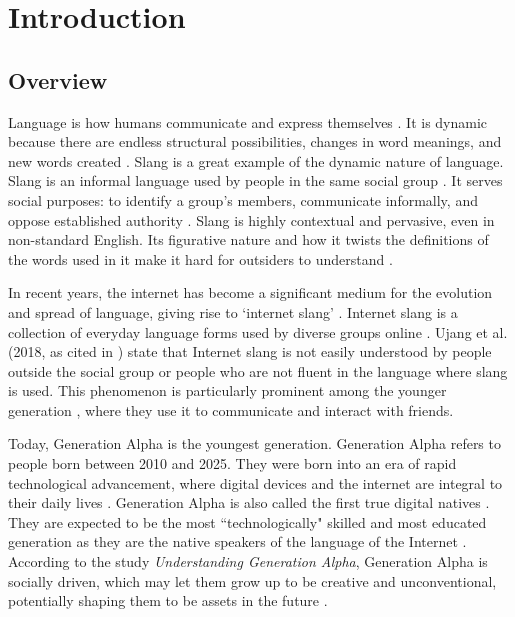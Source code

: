 \chapter{Introduction}
\label{sec:researchdesc}    %

\section{Overview}
\label{sec:overview}

Language is how humans communicate and express themselves \cite{Crystal_Robins_2024}.
It is dynamic because there are endless structural possibilities, changes in word meanings, and new words created \cite{Libretexts_2021}.
Slang is a great example of the dynamic nature of language. Slang is an informal language used by people in the same social group \cite{Fernández-Toro_2016}.
It serves social purposes: to identify a group's members, communicate informally, and oppose established authority \cite{McArthur_1998}. Slang is highly contextual and pervasive, even in non-standard English. \cite{Roth-Gordon2020}
Its figurative nature and how it twists the definitions of the words used in it make it hard for outsiders to understand \cite{Mattiello2005ThePO}. 

In recent years, the internet has become a significant medium for the evolution and spread of language, giving rise to `internet slang' \cite{Liu_Zhang_Li_2023}.
Internet slang is a collection of everyday language forms used by diverse groups online \cite{Barseghyan2014ONSA}.
Ujang et al. (2018, as cited in \cite{Sabri2020}) state that Internet slang is not easily understood by people outside the social group or people who are not fluent in the language where slang is used.
This phenomenon is particularly prominent among the younger generation \cite{Maulidiya_Wijaya_Mauren_Adha_Pandin_2021}, where they use it to communicate and interact with friends.

Today, Generation Alpha is the youngest generation. Generation Alpha refers to people born between 2010 and 2025.
They were born into an era of rapid technological advancement, where digital devices and the internet are integral to their daily lives \cite{McCrindle2020}.
Generation Alpha is also called the first true digital natives \cite{Jukic_Skojo2021}.
They are expected to be the most ``technologically" skilled and most educated generation as they are the native speakers of the language of the Internet \cite{Prensky_2001b}.
According to the study \textit{Understanding Generation Alpha}, Generation Alpha is socially driven, which may let them grow up to be creative and unconventional, potentially shaping them to be assets in the future \cite{Jha2020}.

